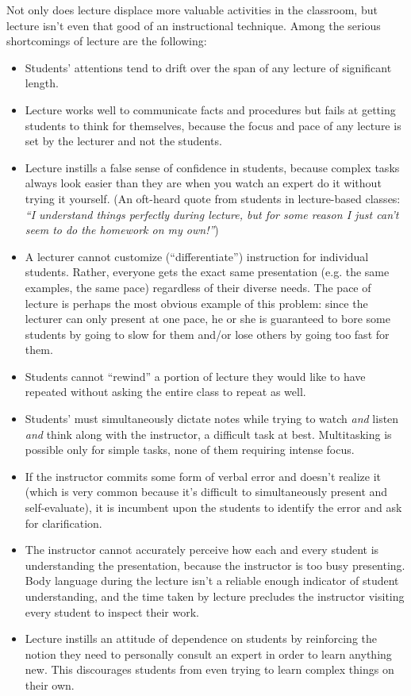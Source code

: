 \vfil \eject

\noindent
Not only does lecture displace more valuable activities in the classroom, but lecture isn't even that good of an instructional technique.  Among the serious shortcomings of lecture are the following:

\begin{itemize}
\item{} Students' attentions tend to drift over the span of any lecture of significant length.
\vskip 5pt
\item{} Lecture works well to communicate facts and procedures but fails at getting students to think for themselves, because the focus and pace of any lecture is set by the lecturer and not the students.
\vskip 5pt
\item{} Lecture instills a false sense of confidence in students, because complex tasks always look easier than they are when you watch an expert do it without trying it yourself.  (An oft-heard quote from students in lecture-based classes: {\it ``I understand things perfectly during lecture, but for some reason I just can't seem to do the homework on my own!''})
\vskip 5pt
\item{} A lecturer cannot customize (``differentiate'') instruction for individual students.  Rather, everyone gets the exact same presentation (e.g. the same examples, the same pace) regardless of their diverse needs.  The pace of lecture is perhaps the most obvious example of this problem: since the lecturer can only present at one pace, he or she is guaranteed to bore some students by going to slow for them and/or lose others by going too fast for them.
\vskip 5pt
\item{} Students cannot ``rewind'' a portion of lecture they would like to have repeated without asking the entire class to repeat as well.
\vskip 5pt
\item{} Students' must simultaneously dictate notes while trying to watch {\it and} listen {\it and} think along with the instructor, a difficult task at best.  Multitasking is possible only for simple tasks, none of them requiring intense focus.
\vskip 5pt
\item{} If the instructor commits some form of verbal error and doesn't realize it (which is very common because it's difficult to simultaneously present and self-evaluate), it is incumbent upon the students to identify the error and ask for clarification.
\vskip 5pt
\item{} The instructor cannot accurately perceive how each and every student is understanding the presentation, because the instructor is too busy presenting.  Body language during the lecture isn't a reliable enough indicator of student understanding, and the time taken by lecture precludes the instructor visiting every student to inspect their work.
\vskip 5pt
\item{} Lecture instills an attitude of dependence on students by reinforcing the notion they need to personally consult an expert in order to learn anything new.  This discourages students from even trying to learn complex things on their own.
\end{itemize}


